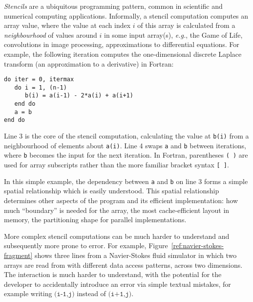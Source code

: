 \documentclass[9pt]{sigplanconf}
\theoremstyle{definition}
\newcommand{\eg}{\emph{e.g.}}
\begin{document}
\emph{Stencils} are a ubiquitous programming pattern, common in
scientific and numerical computing applications. Informally, a stencil
computation computes an array value, where the value at each index $i$ of
this array is calculated from a \emph{neighbourhood} of values around $i$ in
some input array(s), \eg{}, the Game of Life, convolutions in image
processing, approximations to differential equations. For example, the
following iteration computes the one-dimensional discrete Laplace
transform (an approximation to a derivative) in Fortran:
%
\begin{verbatim}
do iter = 0, itermax
   do i = 1, (n-1)
      b(i) = a(i-1) - 2*a(i) + a(i+1)
   end do
   a = b
end do
\end{verbatim}
%
Line 3 is the core of the stencil computation, calculating
the value at \texttt{b(i)} from a neighbourhood of elements about
\texttt{a(i)}. Line 4 swaps
\texttt{a} and \texttt{b} between iterations, where \texttt{b} becomes the
input for the next iteration. In Fortran, parentheses \texttt{( )} are used
for array subscripts rather than the more familiar bracket syntax \texttt{[ ]}.

In this simple example, the dependency between \texttt{a}
and \texttt{b} on line 3 forms a simple spatial relationship which is easily
understood. This spatial relationship determines other aspects of the
program and its efficient implementation: how much ``boundary'' is
needed for the array, the most cache-efficient layout in memory,
the partitioning shape for parallel implementations.

More complex stencil computations can be much harder to understand and
subsequently more prone to error. For example,
Figure~\ref{ref:navier-stokes-fragment} shows three lines from a
Navier-Stokes fluid simulator in which two arrays are read from with
different data access patterns, across two dimensions. The interaction
is much harder to understand, with the potential for the developer to
accidentally introduce an error via simple textual mistakes, for
example writing $\texttt{(i-1,j)}$ instead of $\texttt{(i+1,j)}$.
\end{document}
